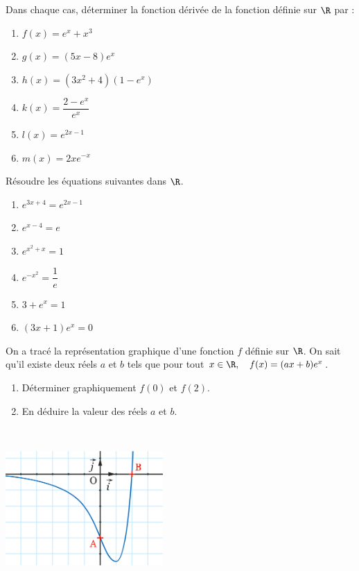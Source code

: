 \documentclass[a4paper,11pt,exos]{nsi} %
\begin{document}
\exo{}
Dans chaque cas, déterminer la fonction dérivée de la fonction définie sur $\R$ par :
\begin{multicols}{3}
    \begin{enumerate}
        \item $f(x)=e^x+x^3$ 
        \item $g(x)=(5x-8)e^x$
        \item $h(x)=\left(3x^2+4\right)\left(1-e^x\right)$
        \item $k(x)=\dfrac{2-e^x}{e^x}$
        \item $l(x)=e^{2x-1}$
        \item $m(x)=2xe^{-x}$
    \end{enumerate}
\end{multicols} 

\exo{}
Résoudre les équations suivantes dans $\R$.
\begin{multicols}{3}
	\begin{enumerate}
		\item	$e^{3x+4}=e^{2x-1}$
		\item 	$e^{x-4}=e$
		\item 	$e^{x^2+x}=1$
		\item	$e^{-x^2}=\dfrac{1}{e}$
		\item	$3+e^x=1$
		\item	$(3x+1)e^x=0$
	\end{enumerate}
\end{multicols}



\begin{minipage}{10cm}
	\exo{}
	On a tracé la représentation graphique d'une fonction $f$ définie sur $\R$. On sait qu'il existe deux réels $a$ et $b$ tels que pour tout $x\in\R, \quad f(x)=(ax+b)e^x$.
	\begin{enumerate}
		\item 	Déterminer graphiquement $f(0)$ et $f(2)$.
		\item 	En déduire la valeur des réels $a$ et $b$.	
	\end{enumerate}
\end{minipage}
\begin{minipage}{1cm}
	\ \\
\end{minipage}
\begin{minipage}{6cm}
	\includegraphics[width=6cm]{courbe1}
\end{minipage}
\end{document}
